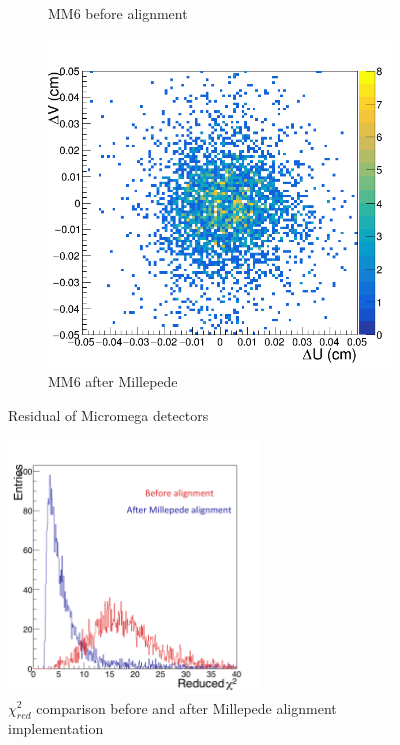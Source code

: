 \begin{figure}[h!]
\begin{subfigure}[l]{.45\textwidth}
   \caption{MM6 before alignment}
   \label{fig:MX6_before}
 \end{subfigure}
 \begin{subfigure}[r]{.45\textwidth}
   \centering
   \includegraphics[width=\linewidth]{thesis_figures/alignment/Run_3211_after_millepede/square/MX7.png}
   \caption{MM6 after Millepede}
   \label{fig:MX6_after}
 \end{subfigure}
 \caption{Residual of Micromega detectors}
 \label{fig:MX_residuals_2}
\end{figure}

\begin{figure}[h!]
\centering
\includegraphics[width=0.6\textwidth]{thesis_figures/alignment/red_chi2_bvs_after_square.png}
\caption{$\chi_{red}^2$ comparison before and after Millepede alignment implementation}
\label{fig:red_chi2_1}
\end{figure}

